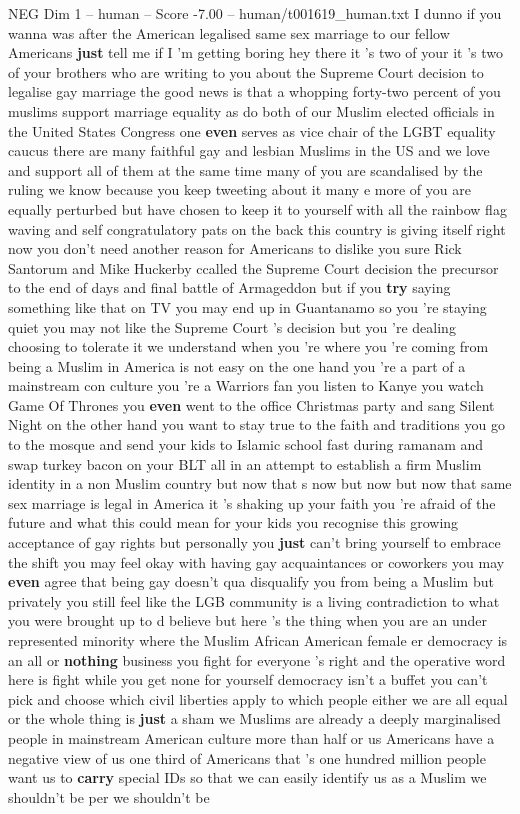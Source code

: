 \begin{textsample}{NEG Dim 1 – human – Score -7.00 – human/t001619\_human.txt}  \label{ex:f1_neg_032}
I dunno if you wanna was after the American legalised same sex marriage to our fellow Americans \textbf{just} tell me if I 'm getting boring hey there it 's two of your it 's two of your brothers who are writing to you about the Supreme Court decision to legalise gay marriage the good news is that a whopping forty-two percent of you muslims support marriage equality as do both of our Muslim elected officials in the United States Congress one \textbf{even} serves as vice chair of the LGBT equality caucus there are many faithful gay and lesbian Muslims in the US and we love and support all of them at the same time many of you are scandalised by the ruling we know because you keep tweeting about it many e more of you are equally perturbed but have chosen to keep it to yourself with all the rainbow flag waving and self congratulatory pats on the back this country is giving itself right now you don't need another reason for Americans to dislike you sure Rick Santorum and Mike Huckerby ccalled the Supreme Court decision the precursor to the end of days and final battle of Armageddon but if you \textbf{try} saying something like that on TV you may end up in Guantanamo so you 're staying quiet you may not like the Supreme Court 's decision but you 're dealing choosing to tolerate it we understand when you 're where you 're coming from being a Muslim in America is not easy on the one hand you 're a part of a mainstream con culture you 're a Warriors fan you listen to Kanye you watch Game Of Thrones you \textbf{even} went to the office Christmas party and sang Silent Night on the other hand you want to stay true to the faith and traditions you go to the mosque and send your kids to Islamic school fast during ramanam and swap turkey bacon on your BLT all in an attempt to establish a firm Muslim identity in a non Muslim country but now that s now but now but now that same sex marriage is legal in America it 's shaking up your faith you 're afraid of the future and what this could mean for your kids you recognise this growing acceptance of gay rights but personally you \textbf{just} can't bring yourself to embrace the shift you may feel okay with having gay acquaintances or coworkers you may \textbf{even} agree that being gay doesn't qua disqualify you from being a Muslim but privately you still feel like the LGB community is a living contradiction to what you were brought up to d believe but here 's the thing when you are an under represented minority where the Muslim African American female er democracy is an all or \textbf{nothing} business you fight for everyone 's right and the operative word here is fight while you get none for yourself democracy isn't a buffet you can't pick and choose which civil liberties apply to which people either we are all equal or the whole thing is \textbf{just} a sham we Muslims are already a deeply marginalised people in mainstream American culture more than half or us Americans have a negative view of us one third of Americans that 's one hundred million people want us to \textbf{carry} special IDs so that we can easily identify us as a Muslim we shouldn't be per we shouldn't be 
\end{textsample}
